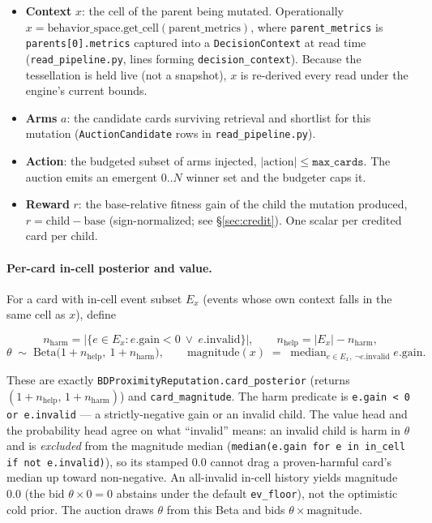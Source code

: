 \documentclass[11pt]{article}
\newcommand{\code}[1]{\texttt{#1}}
\begin{document}
\begin{itemize}[leftmargin=2em,itemsep=2pt]
\item \textbf{Context} $x$: the cell of the parent being mutated. Operationally
$x = \text{behavior\_space.get\_cell}(\text{parent\_metrics})$, where
\code{parent\_metrics} is \code{parents[0].metrics} captured into a
\code{DecisionContext} at read time (\code{read\_pipeline.py}, lines forming
\code{decision\_context}). Because the tessellation is held live (not a snapshot),
$x$ is re-derived every read under the engine's current bounds.
\item \textbf{Arms} $a$: the candidate cards surviving retrieval and shortlist
for this mutation (\code{AuctionCandidate} rows in \code{read\_pipeline.py}).
\item \textbf{Action}: the budgeted subset of arms injected, $\lvert
\text{action}\rvert \le \code{max\_cards}$. The auction emits an emergent
$0..N$ winner set and the budgeter caps it.
\item \textbf{Reward} $r$: the base-relative fitness gain of the child the
mutation produced, $r = \text{child} - \text{base}$ (sign-normalized; see
\S\ref{sec:credit}). One scalar per credited card per child.
\end{itemize}

\paragraph{Per-card in-cell posterior and value.} For a card with in-cell event
subset $E_x$ (events whose own context falls in the same cell as $x$), define

\[
n_{\text{harm}} = \bigl\lvert\{e \in E_x : e.\text{gain} < 0 \ \lor\ e.\text{invalid}\}\bigr\rvert,
\qquad
n_{\text{help}} = \lvert E_x\rvert - n_{\text{harm}},
\]
\[
\theta \;\sim\; \mathrm{Beta}\bigl(1 + n_{\text{help}},\ 1 + n_{\text{harm}}\bigr),
\qquad
\text{magnitude}(x) \;=\; \operatorname{median}_{e \in E_x,\ \neg e.\text{invalid}} e.\text{gain}.
\]

These are exactly \code{BDProximityReputation.card\_posterior} (returns
$(1+n_{\text{help}},\,1+n_{\text{harm}})$) and \code{card\_magnitude}. The harm
predicate is \code{e.gain < 0 or e.invalid} --- a strictly-negative gain or an
invalid child. The value head and the probability head agree on what ``invalid''
means: an invalid child is harm in $\theta$ and is \emph{excluded} from the
magnitude median (\code{median(e.gain for e in in\_cell if not e.invalid)}), so its
stamped $0.0$ cannot drag a proven-harmful card's median up toward non-negative.
An all-invalid in-cell history yields magnitude $0.0$ (the bid
$\theta\!\times\!0 = 0$ abstains under the default \code{ev\_floor}), not the
optimistic cold prior. The auction draws $\theta$ from this Beta and bids
$\theta\!\times\!\text{magnitude}$.
\end{document}
